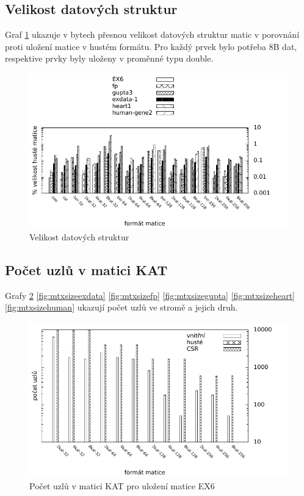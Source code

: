 \subsection{Velikost datových struktur}

Graf \ref{fig:mtxsize} ukazuje v bytech přesnou velikost datových struktur matic v porovnání proti uložení matice v hustém formátu. Pro každý prvek bylo potřeba 8B dat, respektive prvky byly uloženy v proměnné typu double.

\begin{figure}[H]
	\includegraphics[width=1.0\textwidth]{./images/measure1/ram-up}
	\caption{Velikost datových struktur}
	\label{fig:mtxsize}
\end{figure}

\subsection{Počet uzlů v matici KAT}

Grafy \ref{fig:mtxsizeEX6} \ref{fig:mtxsizeexdata} \ref{fig:mtxsizefp} \ref{fig:mtxsizegupta} \ref{fig:mtxsizeheart} \ref{fig:mtxsizehuman} ukazují počet uzlů ve stromě a jejich druh.

\begin{figure}[htb]
	\includegraphics[width=1.0\textwidth]{./images/measure1/kat_nodes_EX6}
	\caption{Počet uzlů v matici KAT pro uložení matice EX6}
	\label{fig:mtxsizeEX6}
\end{figure}

